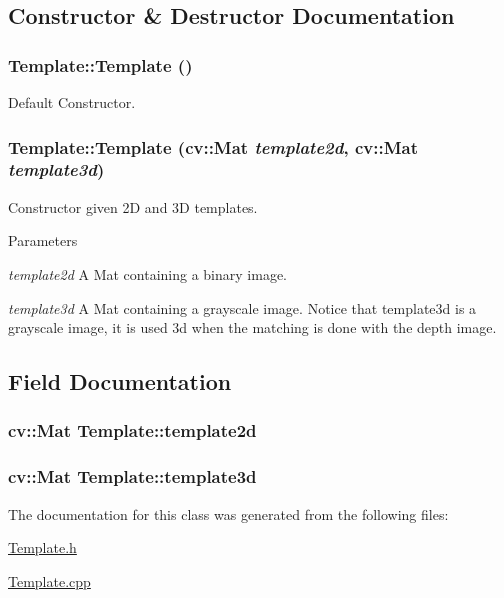 \subsection{Constructor \& Destructor Documentation}
\hypertarget{classTemplate_afea5166b9ca0022fe21c2ed4882c161a}{
\subsubsection[{Template}]{\setlength{\rightskip}{0pt plus 5cm}Template::Template ()}}
\label{classTemplate_afea5166b9ca0022fe21c2ed4882c161a}
Default Constructor. \hypertarget{classTemplate_a9234aea5815f2a8d8bde56f635b2d2f3}{
\subsubsection[{Template}]{\setlength{\rightskip}{0pt plus 5cm}Template::Template (cv::Mat {\em template2d}, \/  cv::Mat {\em template3d})}}
\label{classTemplate_a9234aea5815f2a8d8bde56f635b2d2f3}
Constructor given 2D and 3D templates. 
\begin{DoxyParams}{Parameters}
\item[{\em template2d}]A Mat containing a binary image. \item[{\em template3d}]A Mat containing a grayscale image. Notice that template3d is a grayscale image, it is used 3d when the matching is done with the depth image. \end{DoxyParams}


\subsection{Field Documentation}
\hypertarget{classTemplate_a65d3e446fb6ac165be19da2d747e85ed}{
\subsubsection[{template2d}]{\setlength{\rightskip}{0pt plus 5cm}cv::Mat {\bf Template::template2d}}}
\label{classTemplate_a65d3e446fb6ac165be19da2d747e85ed}
\hypertarget{classTemplate_a27b16dc049359b1ac3ee24b08841ba56}{
\subsubsection[{template3d}]{\setlength{\rightskip}{0pt plus 5cm}cv::Mat {\bf Template::template3d}}}
\label{classTemplate_a27b16dc049359b1ac3ee24b08841ba56}


The documentation for this class was generated from the following files:\begin{DoxyCompactItemize}
\item 
\hyperlink{Template_8h}{Template.h}\item 
\hyperlink{Template_8cpp}{Template.cpp}\end{DoxyCompactItemize}
